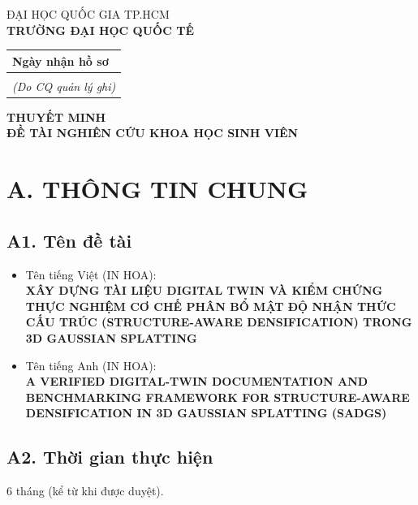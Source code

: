 \documentclass[a4paper,12pt]{article}
\begin{document}
\begin{minipage}[t]{0.68\textwidth}
\centering
\textsc{ĐẠI HỌC QUỐC GIA TP.HCM}\\
\textbf{TRƯỜNG ĐẠI HỌC QUỐC TẾ}
\end{minipage}
\hfill
\begin{minipage}[t]{0.28\textwidth}
\small
\begin{tabular}{|p{3.4cm}|}
\hline
Ngày nhận hồ sơ \\
\hline
\rule{0pt}{1.1cm} \\
\hline
\multicolumn{1}{c}{\footnotesize\textit{(Do CQ quản lý ghi)}} \\
\end{tabular}
\end{minipage}

\vspace{0.6cm}
\begin{center}
{\LARGE\bfseries THUYẾT MINH}\\[2pt]
{\Large\bfseries ĐỀ TÀI NGHIÊN CỨU KHOA HỌC SINH VIÊN}
\end{center}

\vspace{0.4cm}
\section*{A. THÔNG TIN CHUNG}
\vspace{-0.3cm}

\subsection*{A1. Tên đề tài}
\begin{itemize}[leftmargin=1.2em]
\item Tên tiếng Việt (IN HOA):\\
\textbf{XÂY DỰNG TÀI LIỆU DIGITAL TWIN VÀ KIỂM CHỨNG THỰC NGHIỆM CƠ CHẾ PHÂN BỔ MẬT ĐỘ NHẬN THỨC CẤU TRÚC (STRUCTURE-AWARE DENSIFICATION) TRONG 3D GAUSSIAN SPLATTING}
\item Tên tiếng Anh (IN HOA):\\
\textbf{A VERIFIED DIGITAL-TWIN DOCUMENTATION AND BENCHMARKING FRAMEWORK FOR STRUCTURE-AWARE DENSIFICATION IN 3D GAUSSIAN SPLATTING (SADGS)}
\end{itemize}

\subsection*{A2. Thời gian thực hiện}
6 tháng (kể từ khi được duyệt).
\end{document}
